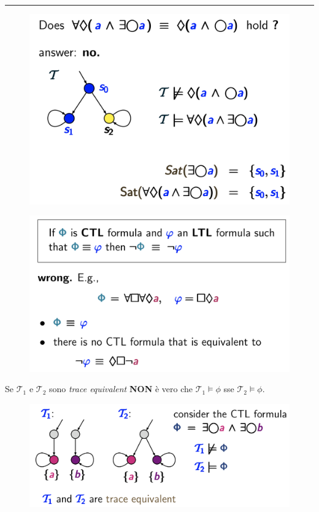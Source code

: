 \documentclass[a4paper, notitlepage, 9pt]{extreport}
\begin{document}
\hrule
\begin{multicols}{3}
\begin{figure}[H]
	\centering
	\includegraphics[scale=0.14]{vv}
\end{figure}
\columnbreak
\begin{figure}[H]
	\centering
	\includegraphics[scale=0.15]{wrong}
\end{figure}
\columnbreak
\noindent
Se $\mathcal{T}_1$ e $\mathcal{T}_2$ sono \textit{trace equivalent} \textbf{NON} è vero che $\mathcal{T}_1 \vDash \phi$ sse $\mathcal{T}_2 \vDash \phi$.
\begin{figure}[H]
	\centering
	\includegraphics[scale=0.12]{end}
\end{figure}
\end{multicols}
\end{document}
